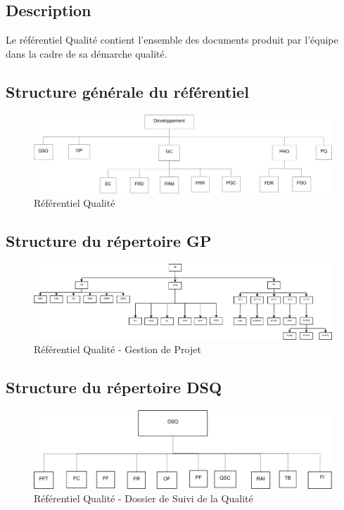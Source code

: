 \subsection{Description}

Le référentiel Qualité contient l'ensemble des documents produit par l'équipe \nomEquipe{}
dans la cadre de sa démarche qualité.

\subsection{Structure générale du référentiel}\label{ref_qualite}



\begin{figure}[ht]
         \begin{center}
         \includegraphics[scale=0.4]{images/arboQualite}
         \end{center}
         \caption{Référentiel Qualité}
 \end{figure}
 
\clearpage

\subsection{Structure du répertoire GP}

\begin{figure}[ht]
         \begin{center}
         \includegraphics[scale=0.22]{images/arboGP}
         \end{center}
         \caption{Référentiel Qualité - Gestion de Projet}
 \end{figure}
 
 \subsection{Structure du répertoire DSQ}

\begin{figure}[ht]
         \begin{center}
         \includegraphics[scale=0.5]{images/arboDSQ}
         \end{center}
         \caption{Référentiel Qualité - Dossier de Suivi de la Qualité}
 \end{figure}

